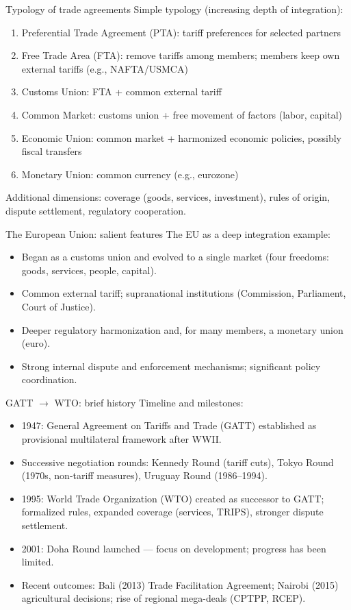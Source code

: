 \documentclass[notes,11pt, aspectratio=169, xcolor=table]{beamer}
\begin{document}
\begin{frame}{Typology of trade agreements}
  Simple typology (increasing depth of integration):
  \begin{enumerate}
    \item Preferential Trade Agreement (PTA): tariff preferences for selected partners
    \item Free Trade Area (FTA): remove tariffs among members; members keep own external tariffs (e.g., NAFTA/USMCA)
    \item Customs Union: FTA + common external tariff
    \item Common Market: customs union + free movement of factors (labor, capital)
    \item Economic Union: common market + harmonized economic policies, possibly fiscal transfers
    \item Monetary Union: common currency (e.g., eurozone)
  \end{enumerate}
  Additional dimensions: coverage (goods, services, investment), rules of origin, dispute settlement, regulatory cooperation.
\end{frame}

\begin{frame}{The European Union: salient features}
  The EU as a deep integration example:
  \begin{itemize}
    \item Began as a customs union and evolved to a single market (four freedoms: goods, services, people, capital).
    \item Common external tariff; supranational institutions (Commission, Parliament, Court of Justice).
    \item Deeper regulatory harmonization and, for many members, a monetary union (euro).
    \item Strong internal dispute and enforcement mechanisms; significant policy coordination.
  \end{itemize}
\end{frame}

\begin{frame}{GATT $\rightarrow$ WTO: brief history}
  Timeline and milestones:
  \begin{itemize}
    \item 1947: General Agreement on Tariffs and Trade (GATT) established as provisional multilateral framework after WWII.
    \item Successive negotiation rounds: Kennedy Round (tariff cuts), Tokyo Round (1970s, non-tariff measures), Uruguay Round (1986–1994).
    \item 1995: World Trade Organization (WTO) created as successor to GATT; formalized rules, expanded coverage (services, TRIPS), stronger dispute settlement.
    \item 2001: Doha Round launched — focus on development; progress has been limited.
    \item Recent outcomes: Bali (2013) Trade Facilitation Agreement; Nairobi (2015) agricultural decisions; rise of regional mega-deals (CPTPP, RCEP).
  \end{itemize}
\end{frame}
\end{document}
